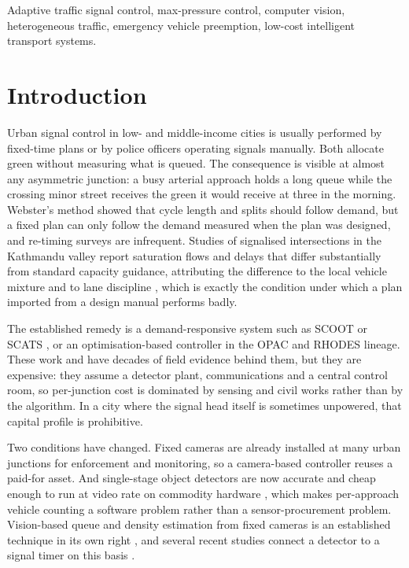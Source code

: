 \documentclass[journal]{IEEEtran}
\begin{document}
\begin{IEEEkeywords}
Adaptive traffic signal control, max-pressure control, computer
vision, heterogeneous traffic, emergency vehicle preemption, low-cost intelligent transport systems.
\end{IEEEkeywords}

\section{Introduction}

Urban signal control in low- and middle-income cities is usually performed by fixed-time plans or by
police officers operating signals manually. Both allocate green without measuring what is queued.
The consequence is visible at almost any asymmetric junction: a busy arterial approach holds a long
queue while the crossing minor street receives the green it would receive at three in the morning.
Webster's method \cite{Webster1958TrafficSignalSettings} showed that cycle length and splits should
follow demand, but a fixed plan can only follow the demand measured when the plan was designed, and
re-timing surveys are infrequent. Studies of signalised intersections in the Kathmandu valley report
saturation flows and delays that differ substantially from standard capacity guidance, attributing
the difference to the local vehicle mixture and to lane discipline
\cite{shrestha2014development,nepali2024assessment}, which is exactly the condition under which a
plan imported from a design manual performs badly.

The established remedy is a demand-responsive system such as SCOOT
\cite{Hunt1981SCOOT,Robertson1991SCOOTMethod} or SCATS \cite{Sims1980SCATS}, or an
optimisation-based controller in the OPAC \cite{Gartner1983OPAC} and RHODES
\cite{Mirchandani2001RHODES} lineage. These work and have decades of field evidence behind them, but
they are expensive: they assume a detector plant, communications and a central control room, so
per-junction cost is dominated by sensing and civil works rather than by the algorithm. In a city where
the signal head itself is sometimes unpowered, that capital profile is prohibitive.

Two conditions have changed. Fixed cameras are already installed at many urban junctions for
enforcement and monitoring, so a camera-based controller reuses a paid-for asset. And single-stage
object detectors are now accurate and cheap enough to run at video rate on commodity hardware
\cite{redmon2016yolo,bochkovskiy2020yolov4}, which makes per-approach vehicle counting a software
problem rather than a sensor-procurement problem. Vision-based queue and density estimation from fixed
cameras is an established technique in its own right
\cite{umair2021efficient,harilakshmi2023deep,abewickrema2025ensemble}, and several recent studies
connect a detector to a signal timer on this basis
\cite{papanashi2024adaptive,alruyshid2025aibased,talaat2025smart,medvei2025deepsignal}.
\end{document}
